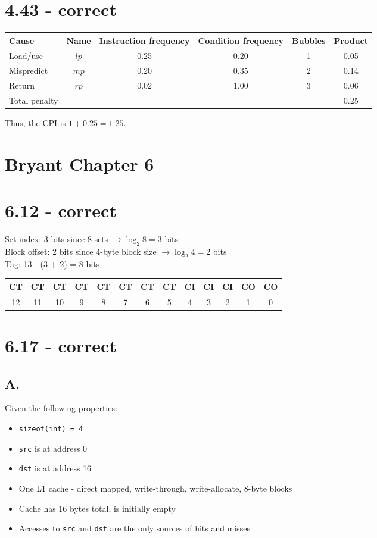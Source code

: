 \documentclass{article}
\begin{document}
\section*{4.43 - correct}
\begin{tabular}{l c c c c c}
    Cause & Name & Instruction frequency & Condition frequency & Bubbles & Product \\
    \hline
    Load/use  & $lp$ & 0.25 & 0.20 & 1 & 0.05 \\
    Mispredict & $mp$ & 0.20 & 0.35 & 2 & 0.14 \\
    Return & $rp$ & 0.02 & 1.00 & 3 & 0.06 \\
    Total penalty & & & & & 0.25 \\
\end{tabular}

\vspace{1em}\noindent
Thus, the CPI is $1 + 0.25 = 1.25$.

\section*{Bryant Chapter 6}

\section*{6.12 - correct}
Set index: 3 bits since 8 sets $\rightarrow \log_2 8 = 3$ bits \\
Block offset: 2 bits since 4-byte block size $\rightarrow \log_2 4 = 2$ bits \\
Tag: 13 - (3 + 2) = 8 bits \\
\begin{tabular}{|c|c|c|c|c|c|c|c|c|c|c|c|c|}
    \hline
    CT & CT & CT & CT & CT & CT & CT & CT & CI & CI & CI & CO & CO \\
    \hline
    12 & 11 & 10 & 9 & 8 & 7 & 6 & 5 & 4 & 3 & 2 & 1 & 0 \\
    \hline
\end{tabular}

\section*{6.17 - correct}

\subsection*{A.}
Given the following properties:
\begin{itemize}
    \item \texttt{sizeof(int) = 4}
    \item \texttt{src} is at address 0
    \item \texttt{dst} is at address 16
    \item One L1 cache - direct mapped, write-through, write-allocate, 8-byte blocks
    \item Cache has 16 bytes total, is initially empty
    \item Accesses to \texttt{src} and \texttt{dst} are the only sources of hits and misses
\end{itemize}
\end{document}
